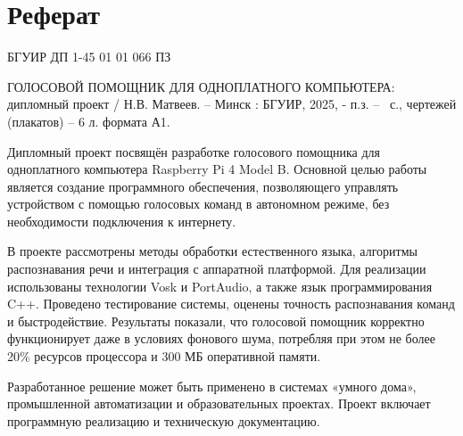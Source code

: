\section*{Реферат}
\thispagestyle{empty} %

\noindent БГУИР ДП 1-45 01 01 066 ПЗ
\newline


\nohyphens{ГОЛОСОВОЙ ПОМОЩНИК ДЛЯ ОДНОПЛАТНОГО КОМПЬЮТЕРА}: дипломный проект / Н.В. Матвеев. – Минск : БГУИР, 2025, - п.з. – \pageref{LastPage}~с., чертежей (плакатов) – 6 л. формата А1.

Дипломный проект посвящён разработке голосового помощника для одноплатного компьютера Raspberry Pi 4 Model B. Основной целью работы является создание программного обеспечения, позволяющего управлять устройством с помощью голосовых команд в автономном режиме, без необходимости подключения к интернету.

В проекте рассмотрены методы обработки естественного языка, алгоритмы распознавания речи и интеграция с аппаратной платформой. Для реализации использованы технологии Vosk и PortAudio, а также язык программирования C++. Проведено тестирование системы, оценены точность распознавания команд и быстродействие. Результаты показали, что голосовой помощник корректно функционирует даже в условиях фонового шума, потребляя при этом не более 20\% ресурсов процессора и 300 МБ оперативной памяти.

Разработанное решение может быть применено в системах «умного дома», промышленной автоматизации и образовательных проектах. Проект включает программную реализацию и техническую документацию.

\clearpage
